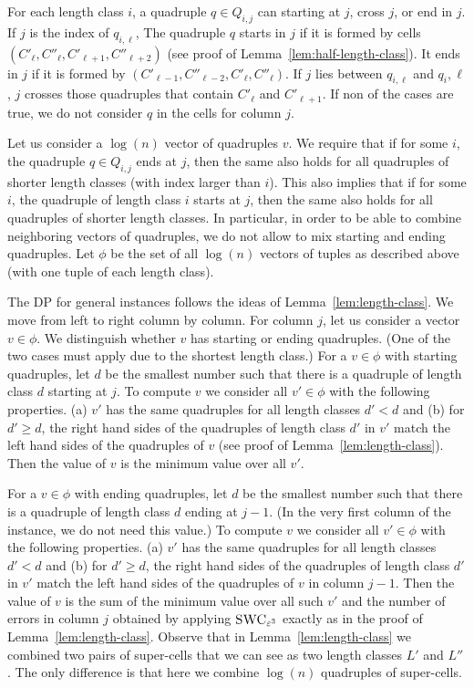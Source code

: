 For each length class $i$, a quadruple $q \in Q_{i,j}$ can starting at $j$, cross $j$, or end in $j$.
If $j$ is the index of $q_{i,\ell}$,
The quadruple $q$ starts in $j$ if it is formed by cells $(C'_\ell,C''_\ell,C'_{\ell+1},C''_{\ell+2})$ (see proof of Lemma~\ref{lem:half-length-class}). 
It ends in $j$ if it is formed by $(C'_{\ell-1},C''_{\ell-2},C'_\ell,C''_\ell)$.
If $j$ lies between $q_{i,\ell}$ and $q_i,\ell$, $j$ crosses those quadruples that contain $C'_\ell$ and $C'_{\ell+1}$.
If non of the cases are true, we do not consider $q$ in the cells for column $j$.

Let us consider a $\log(n)$ vector of quadruples $v$.
We require that if for some $i$, the quadruple $q \in Q_{i,j}$ ends at $j$, then the same also holds for all quadruples of shorter length classes (with index larger than $i$).
This also implies that if for some $i$, the quadruple of length class $i$ starts at $j$, then the same also holds for all quadruples of shorter length classes. 
In particular, in order to be able to combine neighboring vectors of quadruples, we do not allow to mix starting and ending quadruples.
Let $\phi$ be the set of all $\log(n)$ vectors of tuples as described above (with one tuple of each length class).

The DP for general instances follows the ideas of Lemma~\ref{lem:length-class}.
We move from left to right column by column.
For column $j$, let us consider a vector $v \in \phi$.
We distinguish whether $v$ has starting or ending quadruples. 
(One of the two cases must apply due to the shortest length class.)
For a $v \in \phi$ with starting quadruples,
let $d$ be the smallest number such that there is a quadruple of length class $d$ starting at $j$.
To compute $v$ we consider all $v' \in \phi$ with the following properties.
(a) $v'$ has the same quadruples for all length classes $d' < d$ and 
(b) for $d' \ge d$, the right hand sides of the quadruples of length class $d'$ in $v'$ match the left hand sides of the quadruples of $v$ (see proof of Lemma~\ref{lem:length-class}).
Then the value of $v$ is the minimum value over all $v'$.

For a $v \in \phi$ with ending quadruples,
let $d$ be the smallest number such that there is a quadruple of length class $d$ ending at $j-1$. (In the very first column of the instance, we do not need this value.)
To compute $v$ we consider all $v' \in \phi$ with the following properties.
(a) $v'$ has the same quadruples for all length classes $d' < d$ and 
(b) for $d' \ge d$, the right hand sides of the quadruples of length class $d'$ in $v'$ match the left hand sides of the quadruples of $v$ in column $j-1$.
Then the value of $v$ is the sum of the minimum value over all such $v'$ and the number of errors in column $j$ obtained by applying $\textsc{SWC}_{\varepsilon^3}$ exactly as in the proof of Lemma~\ref{lem:length-class}.
Observe that in Lemma~\ref{lem:length-class} we combined two pairs of super-cells that we can see as two length classes $L'$ and $L''$. 
The only difference is that here we combine $\log(n)$ quadruples of super-cells.

